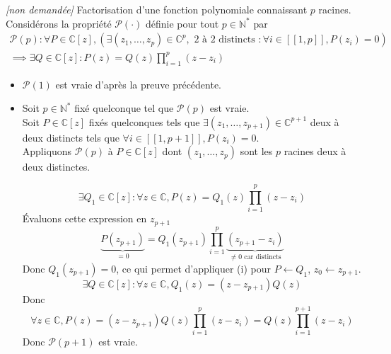 \documentclass{article}
\renewenvironment{question_kholle}[2][ ]
{
	\subsection{\texorpdfstring{#2}{}}
	\notblank{#1}
	{
		\noindent #1
		\bigbreak
	}
	{}
	\begin{proof}
}
{
	\end{proof}
}
\begin{document}
	{\textit{[non demandée]} Factorisation d'une fonction polynomiale connaissant $p$ racines.}
	Considérons la propriété $\mathcal{P}(\cdot)$ définie pour tout $p \in \mathbb{N}^{*}$ par
	\begin{multline*}
		\mathcal{P}(p) : \forall P \in \mathbb{C}[z], (\exists (z_{1}, \dots, z_{p}) \in \mathbb{C}^{p}, \text{ 2 à 2 distincts }: \forall i \in [ \! [ 1, p ] \!], P(z_{i}) = 0)\\
		\implies \exists Q \in \mathbb{C}[z]: P(z) = Q(z) \prod_{i=1}^{p}(z-z_{i})
	\end{multline*}
	\begin{itemize}[label=$\lozenge$]
		\item $\mathcal{P}(1)$ est vraie d'après la preuve précédente.
		\item Soit $p \in \mathbb{N}^{*}$ fixé quelconque tel que $\mathcal{P}(p)$ est vraie.\\
		      Soit $P \in \mathbb{C}[z]$ fixés quelconques tels que $\exists (z_{1}, \dots, z_{p+1}) \in \mathbb{C} ^{p+1}$ deux à deux distincts tels que $\forall i \in [ \! [ 1, p + 1 ] \!], P(z_{i}) = 0$.\\
		      Appliquons $\mathcal{P}(p)$ à $P \in \mathbb{C}[z]$ dont $(z_{1}, \dots, z_{p})$ sont les $p$ racines deux à deux distinctes.

		      $$\exists Q_{1} \in \mathbb{C}[z]:\forall z \in \mathbb{C}, P(z) = Q_{1}(z)\prod_{i=1}^{p}(z-z_{i})$$
		      Évaluons cette expression en $z_{p+1}$
		      $$\underbrace{ P(z_{p+1}) }_{ =0 } = Q_{1}(z_{p+1}) \prod_{i=1}^{p}\underbrace{ (z_{p+1}-z_{i}) }_{ \neq 0 \text{ car distincts} }$$
		      Donc $Q_{1}(z_{p+1}) = 0$, ce qui permet d'appliquer (i) pour $P \leftarrow Q_{1}$, $z_{0} \leftarrow z_{p+1}$.
		      $$
			      \exists Q \in \mathbb{C}[z]:\forall z \in \mathbb{C}, Q_{1}(z)=(z-z_{p+1})Q(z)
		      $$
		      Donc
		      $$
			      \forall z \in \mathbb{C}, P(z) = (z-z_{p+1})Q(z) \prod_{i=1}^{p}(z-z_{i}) = Q(z) \prod_{i=1}^{p+1}(z-z_{i})
		      $$
		      Donc $\mathcal{P}(p+1)$ est vraie.
	\end{itemize}
\end{question_kholle}
\end{document}
